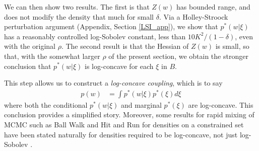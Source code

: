 \documentclass{article}
\numberwithin{equation}{section}
\theoremstyle{Lemma}
\theoremstyle{Corollary}
\theoremstyle{Theorem}
\theoremstyle{Remark}
\begin{document}
We can then show two results.  The first is that $Z(w)$ has bounded range, and does not modify the density that much for small $\delta$. Via a Holley-Stroock perturbation argument (Appendix, Section \ref{LSI_app}),
we show that $p^{*}(w|\xi)$ has a reasonably controlled log-Sobolev constant, less than $10K^{2}/(1-\delta)$, even with the original $\rho$. The second result is that the Hessian of $Z(w)$ is small, so that, with the somewhat larger $\rho$ of the present section, we obtain the stronger conclusion that $p^*(w|\xi)$ is log-concave for each $\xi$ in $B$.

This step allows us to construct a \textit{log-concave coupling}, which is to say
\begin{align}
p(w)&= \int p^{*}(w|\xi)p^{*}(\xi)d\xi
\end{align}
where both the conditional $p^*(w|\xi)$ and marginal $p^*(\xi)$ are log-concave.  This conclusion provides a simplified story. Moreover, some results for rapid mixing of MCMC such as Ball Walk and Hit and Run for densities on a constrained set have been stated naturally for densities required to be log-concave, not just log-Sobolev \cite{lovasz2007geometry}.
\end{document}
